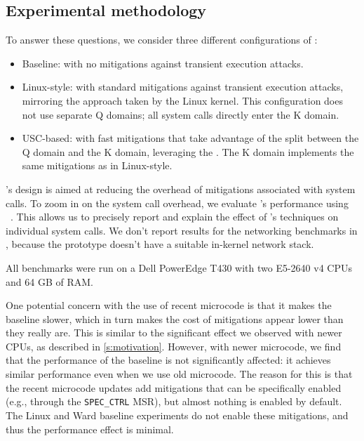 \subsection{Experimental methodology}

To answer these questions, we consider three different configurations of \sys:

\begin{itemize}
\item Baseline: \sys with no mitigations against transient execution attacks.

\item Linux-style: \sys with standard mitigations against transient execution attacks,
mirroring the approach taken by the Linux kernel.  This configuration does
not use separate Q domains; all system calls directly enter the K domain.

\item USC-based: \sys with fast mitigations that take advantage of the split
between the Q domain and the K domain, leveraging the \contract{}.  The
K domain implements the same mitigations as in Linux-style.

\end{itemize}

\sys's design is aimed at reducing the overhead of mitigations
associated with system calls.  To zoom in on the system call overhead,
we evaluate \sys's performance using \bench~\cite{lebench}.
This allows us to precisely report and explain the
effect of \sys's techniques on individual system calls.  We don't
report results for the networking benchmarks in \bench, because the
\sys prototype doesn't have a suitable in-kernel network stack.

All benchmarks were run on a Dell PowerEdge T430 with two E5-2640 v4
CPUs and 64 GB of RAM.


One potential concern with the use of recent microcode is that it makes
the baseline slower, which in turn makes the cost of mitigations appear
lower than they really are.  This is similar to the significant effect
we observed with newer CPUs, as described in \autoref{s:motivation}.
However, with newer microcode, we find that the performance of the
baseline is not significantly affected: it achieves similar performance
even when we use old microcode.  The reason for this is that the recent
microcode updates add mitigations that can be specifically enabled (e.g.,
through the \texttt{SPEC\_CTRL} MSR), but almost nothing is enabled by
default.  The Linux and Ward baseline experiments do not enable these
mitigations, and thus the performance effect is minimal.

